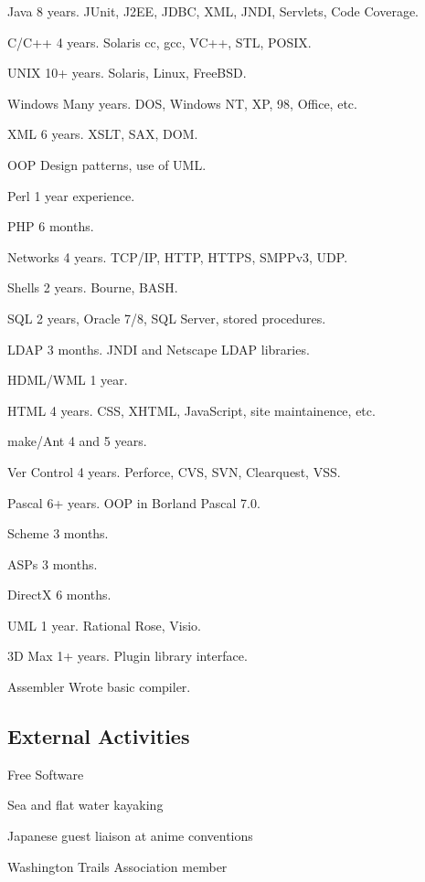 \documentclass{article}
\begin{document}
\begin{multicols}{2}
\begin{items}
\item[Java] 8 years.  JUnit, J2EE, JDBC, XML, JNDI, Servlets, Code Coverage.
\item[C/C++] 4 years.  Solaris cc, gcc, VC++, STL,
POSIX.
\item[UNIX] 10+ years.  Solaris, Linux, FreeBSD.
\item[Windows] Many years.  DOS, Windows NT, XP, 98, Office, etc.
\item[XML] 6 years.  XSLT, SAX, DOM.
\item[OOP] Design patterns, use of UML.
\item[Perl] 1 year experience.
\item[PHP] 6 months.
\item[Networks] 4 years.  TCP/IP, HTTP, HTTPS, SMPPv3, UDP.
\item[Shells] 2 years.  Bourne, BASH.
\item[SQL] 2 years, Oracle 7/8, SQL Server, stored procedures.
\item[LDAP] 3 months.  JNDI and Netscape LDAP libraries.
\item[HDML/WML] 1 year.
\item[HTML]  4 years.  CSS, XHTML, JavaScript, site maintainence, etc.
\item[make/Ant]  4 and 5 years.
\item[Ver Control]  4 years.  Perforce, CVS, SVN, Clearquest, VSS.
\item[Pascal]  6+ years.  OOP in Borland Pascal 7.0.
\item[Scheme] 3 months.
\item[ASPs] 3 months.
\item[DirectX] 6 months.
\item[UML] 1 year.  Rational Rose, Visio.
\item[3D Max] 1+ years.  Plugin library interface.
\item[Assembler] Wrote basic compiler.
\end{items}
\end{multicols}

\subsection*{External Activities}
\begin{items}
\item Free Software
\item Sea and flat water kayaking
\item Japanese guest liaison at anime conventions
\item Washington Trails Association member
\end{items}
\end{document}

